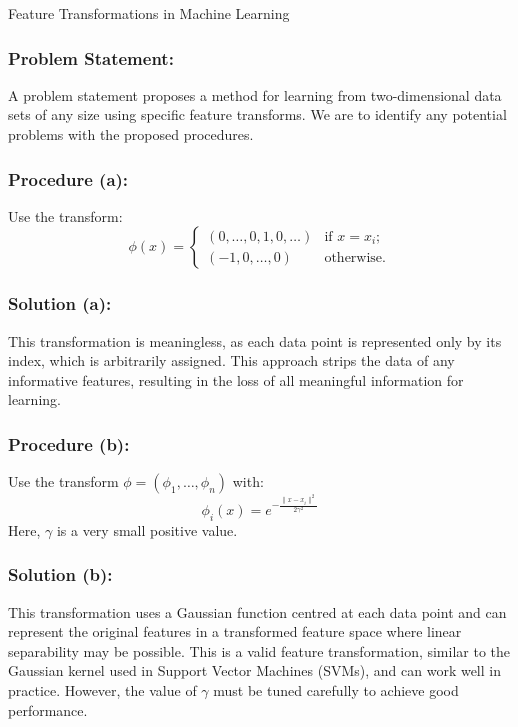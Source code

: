 \begin{examplebox}{Feature Transformations in Machine Learning}

\subsubsection*{Problem Statement:}
A problem statement proposes a method for learning from two-dimensional data sets of any size using specific feature transforms. We are to identify any potential problems with the proposed procedures.\\

\subsubsection*{Procedure (a):}
Use the transform:
\[
\phi(x) = \begin{cases} 
(0,\ldots,0,1,0,\ldots) & \text{if } x = x_i; \\
(-1,0,\ldots,0) & \text{otherwise}.
\end{cases}
\]

\subsubsection*{Solution (a):}
This transformation is meaningless, as each data point is represented only by its index, which is arbitrarily assigned. This approach strips the data of any informative features, resulting in the loss of all meaningful information for learning.

\subsubsection*{Procedure (b):}
Use the transform $\phi = (\phi_1, \ldots, \phi_n)$ with:
\[
\phi_i(x) = e^{-\frac{\|x-x_i\|^2}{2\gamma^2}}
\]
Here, $\gamma$ is a very small positive value.

\subsubsection*{Solution (b):}
This transformation uses a Gaussian function centred at each data point and can represent the original features in a transformed feature space where linear separability may be possible. This is a valid feature transformation, similar to the Gaussian kernel used in Support Vector Machines (SVMs), and can work well in practice. However, the value of $\gamma$ must be tuned carefully to achieve good performance.


\end{examplebox}

